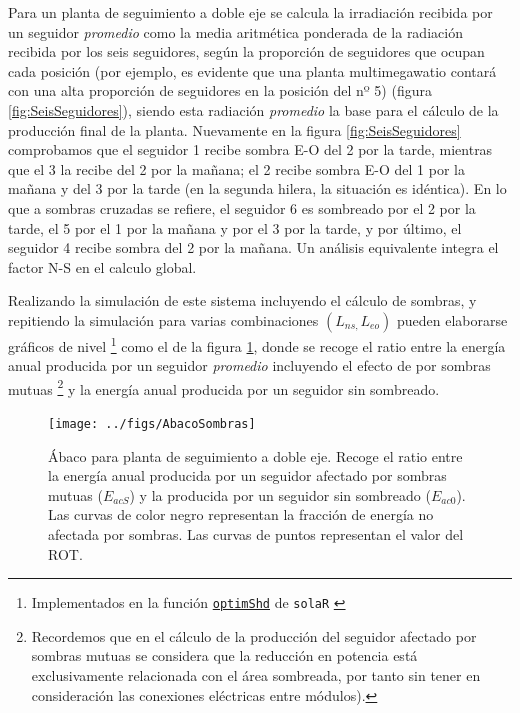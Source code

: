 Para un planta de seguimiento a doble eje se calcula la irradiación 
recibida por un seguidor \emph{promedio} como la media aritmética ponderada 
de la radiación recibida por los seis seguidores, según la proporción 
de seguidores que ocupan cada posición 
(por ejemplo, es evidente que una planta multimegawatio contará con
una alta proporción de seguidores en la posición del nº 5) 
(figura \ref{fig:SeisSeguidores}), siendo esta radiación \emph{promedio}
la base para el cálculo de la producción final de la planta. 
Nuevamente en la figura \ref{fig:SeisSeguidores} comprobamos que 
el seguidor 1 recibe sombra E-O del 2 por la tarde, 
mientras que el 3 la recibe del 2 por la mañana; 
el 2 recibe sombra E-O del 1 por la mañana y 
del 3 por la tarde (en la segunda hilera, la situación es idéntica). 
En lo que a sombras cruzadas se refiere, 
el seguidor 6 es sombreado por el 2 por la tarde, 
el 5 por el 1 por la mañana y por el 3 por la tarde, 
y por último, el seguidor 4 recibe sombra del 2 por la mañana. 
Un análisis equivalente integra el factor N-S en el calculo global.

Realizando la simulación de este sistema incluyendo el cálculo de
sombras, y repitiendo la simulación para varias combinaciones $(L_{ns,}L_{eo})$
pueden elaborarse gráficos de nivel%
\footnote{Implementados en la función
  \href{http://search.r-project.org/R/library/solaR/html/optimShd.html}{\texttt{optimShd}}
  de \texttt{solaR} \cite{Perpinan2012b}}%
 como el de la figura
\ref{fig:Abaco-para-planta}, donde se recoge el ratio entre
la energía anual producida por un seguidor \emph{promedio} incluyendo
el efecto de por sombras mutuas
\footnote{Recordemos
que en el cálculo de la producción del seguidor afectado por sombras
mutuas se considera que la reducción en potencia
está exclusivamente relacionada con el área sombreada, por tanto sin tener en
consideración las conexiones eléctricas entre módulos).}
y la energía anual producida por un seguidor sin sombreado. 

\begin{figure}
\begin{centering}
\texttt{[image: ../figs/AbacoSombras]}
\end{centering}

\caption[Ábaco para planta de seguimiento a doble eje.]{Ábaco para
  planta de seguimiento a doble eje\label{fig:Abaco-para-planta}. 
Recoge el ratio entre la energía anual producida por un seguidor afectado por sombras mutuas
($E_{acS}$) y la producida por un seguidor sin sombreado ($E_{ac0}$). Las curvas
de color negro representan la fracción de energía no afectada por sombras.
Las curvas de puntos representan el valor del ROT. }
\end{figure}


